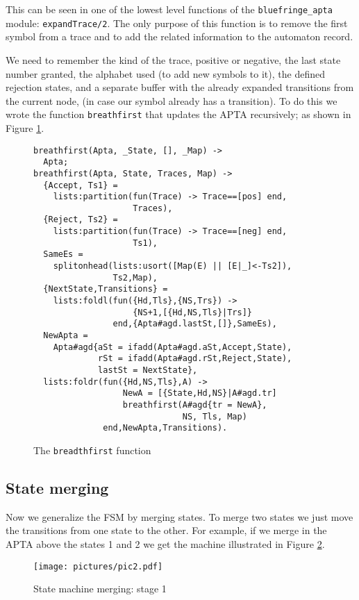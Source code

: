 \documentclass[]{sigplanconf}
\begin{document}
This can be seen in one of the lowest level functions of the
\texttt{bluefringe\_apta} module: \texttt{expandTrace/2}.
The only purpose of this function
is to remove the first symbol from a trace and to add the related 
information to the automaton record.

We need to  remember the kind of the trace, positive or negative, 
the last state number granted,
the alphabet used (to add new symbols to it), the defined
rejection states, and a separate buffer with the already expanded
transitions from the current node, (in case our symbol already
has a transition).
To do this we wrote the function \texttt{breathfirst} that
updates the APTA recursively; as shown in  Figure \ref{breadthfirst}.
\begin{figure}
\begin{verbatim}
breathfirst(Apta, _State, [], _Map) ->
  Apta;
breathfirst(Apta, State, Traces, Map) ->
  {Accept, Ts1} = 
    lists:partition(fun(Trace) -> Trace==[pos] end, 
                    Traces),
  {Reject, Ts2} = 
    lists:partition(fun(Trace) -> Trace==[neg] end, 
                    Ts1),
  SameEs = 
    splitonhead(lists:usort([Map(E) || [E|_]<-Ts2]),
                Ts2,Map),
  {NextState,Transitions} =
    lists:foldl(fun({Hd,Tls},{NS,Trs}) ->
                    {NS+1,[{Hd,NS,Tls}|Trs]}
                end,{Apta#agd.lastSt,[]},SameEs),
  NewApta =
    Apta#agd{aSt = ifadd(Apta#agd.aSt,Accept,State),
             rSt = ifadd(Apta#agd.rSt,Reject,State),
             lastSt = NextState},
  lists:foldr(fun({Hd,NS,Tls},A) ->
                  NewA = [{State,Hd,NS}|A#agd.tr]
                  breathfirst(A#agd{tr = NewA},
                              NS, Tls, Map)
              end,NewApta,Transitions).
\end{verbatim}
\caption{The \texttt{breadthfirst} function}
\label{breadthfirst}
\end{figure}

\subsection{State merging}

Now we generalize the FSM by merging states. To merge two
states we just move the transitions from one state to the other.
For example, if we merge in the APTA above the states 1 and 2
we get the machine illustrated in Figure \ref{fsm2}.

\begin{figure}
\begin{center}
\texttt{[image: pictures/pic2.pdf]}
\end{center}
\caption{State machine merging: stage 1}
\label{fsm2}
\end{figure}
\end{document}
